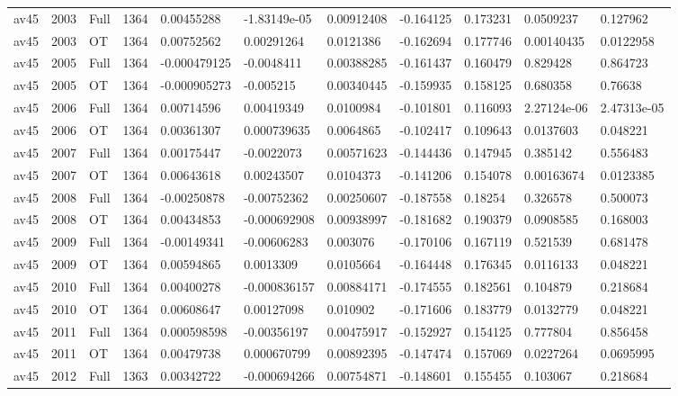 \begin{landscape}
\begin{longtable}{lllllllllll}
av45 & 2003 & Full & 1364 & 0.00455288 & -1.83149e-05 & 0.00912408 & -0.164125 & 0.173231 & 0.0509237 & 0.127962 \\
av45 & 2003 & OT & 1364 & 0.00752562 & 0.00291264 & 0.0121386 & -0.162694 & 0.177746 & 0.00140435 & 0.0122958 \\
av45 & 2005 & Full & 1364 & -0.000479125 & -0.0048411 & 0.00388285 & -0.161437 & 0.160479 & 0.829428 & 0.864723 \\
av45 & 2005 & OT & 1364 & -0.000905273 & -0.005215 & 0.00340445 & -0.159935 & 0.158125 & 0.680358 & 0.76638 \\
av45 & 2006 & Full & 1364 & 0.00714596 & 0.00419349 & 0.0100984 & -0.101801 & 0.116093 & 2.27124e-06 & 2.47313e-05 \\
av45 & 2006 & OT & 1364 & 0.00361307 & 0.000739635 & 0.0064865 & -0.102417 & 0.109643 & 0.0137603 & 0.048221 \\
av45 & 2007 & Full & 1364 & 0.00175447 & -0.0022073 & 0.00571623 & -0.144436 & 0.147945 & 0.385142 & 0.556483 \\
av45 & 2007 & OT & 1364 & 0.00643618 & 0.00243507 & 0.0104373 & -0.141206 & 0.154078 & 0.00163674 & 0.0123385 \\
av45 & 2008 & Full & 1364 & -0.00250878 & -0.00752362 & 0.00250607 & -0.187558 & 0.18254 & 0.326578 & 0.500073 \\
av45 & 2008 & OT & 1364 & 0.00434853 & -0.000692908 & 0.00938997 & -0.181682 & 0.190379 & 0.0908585 & 0.168003 \\
av45 & 2009 & Full & 1364 & -0.00149341 & -0.00606283 & 0.003076 & -0.170106 & 0.167119 & 0.521539 & 0.681478 \\
av45 & 2009 & OT & 1364 & 0.00594865 & 0.0013309 & 0.0105664 & -0.164448 & 0.176345 & 0.0116133 & 0.048221 \\
av45 & 2010 & Full & 1364 & 0.00400278 & -0.000836157 & 0.00884171 & -0.174555 & 0.182561 & 0.104879 & 0.218684 \\
av45 & 2010 & OT & 1364 & 0.00608647 & 0.00127098 & 0.010902 & -0.171606 & 0.183779 & 0.0132779 & 0.048221 \\
av45 & 2011 & Full & 1364 & 0.000598598 & -0.00356197 & 0.00475917 & -0.152927 & 0.154125 & 0.777804 & 0.856458 \\
av45 & 2011 & OT & 1364 & 0.00479738 & 0.000670799 & 0.00892395 & -0.147474 & 0.157069 & 0.0227264 & 0.0695995 \\
av45 & 2012 & Full & 1363 & 0.00342722 & -0.000694266 & 0.00754871 & -0.148601 & 0.155455 & 0.103067 & 0.218684 \\

\end{longtable}
\end{landscape}
